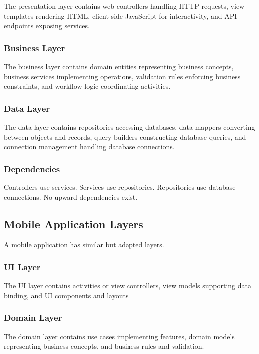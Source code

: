 \documentclass[11pt]{article}
\begin{document}
The presentation layer contains web controllers handling HTTP requests, view templates rendering HTML, client-side JavaScript for interactivity, and API endpoints exposing services.

\subsubsection{Business Layer}

The business layer contains domain entities representing business concepts, business services implementing operations, validation rules enforcing business constraints, and workflow logic coordinating activities.

\subsubsection{Data Layer}

The data layer contains repositories accessing databases, data mappers converting between objects and records, query builders constructing database queries, and connection management handling database connections.

\subsubsection{Dependencies}

Controllers use services. Services use repositories. Repositories use database connections. No upward dependencies exist.

\subsection{Mobile Application Layers}

A mobile application has similar but adapted layers.

\subsubsection{UI Layer}

The UI layer contains activities or view controllers, view models supporting data binding, and UI components and layouts.

\subsubsection{Domain Layer}

The domain layer contains use cases implementing features, domain models representing business concepts, and business rules and validation.
\end{document}
